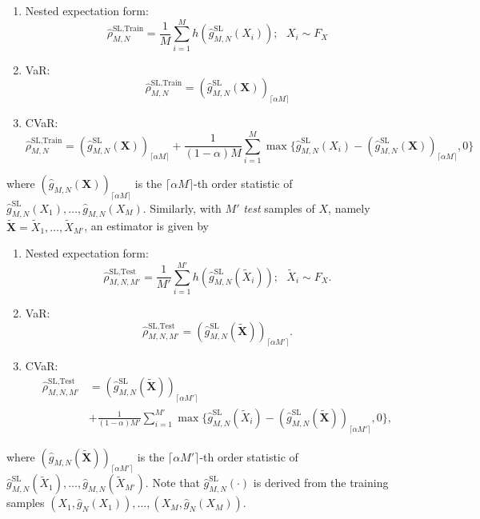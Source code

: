\begin{enumerate}
    \item   Nested expectation form:
            $$\hat{\rho}^{\text{SL}, \text{Train}}_{M, N} = \frac{1}{M} \sum_{i=1}^M h(\hat{g}^{\text{SL}}_{M, N}(X_i)); ~~~ X_i \sim F_X$$
    \item   VaR:
            $$\hat{\rho}^{\text{SL}, \text{Train}}_{M, N} = (\hat{g}^{\text{SL}}_{M, N}(\mathbf{X}))_{\lceil \alpha M \rceil}$$
    \item   CVaR:
            $$\hat{\rho}^{\text{SL}, \text{Train}}_{M, N} = (\hat{g}^{\text{SL}}_{M, N}(\mathbf{X}))_{\lceil \alpha M \rceil} + \frac{1}{(1-\alpha) M} \sum_{i=1}^M \max \{\hat{g}^{\text{SL}}_{M, N}(X_i) - (\hat{g}^{\text{SL}}_{M, N}(\mathbf{X}))_{\lceil \alpha M \rceil}, 0 \}$$
\end{enumerate}
where $(\hat{g}_{M, N}(\mathbf{X}))_{\lceil \alpha M \rceil}$ is the $\lceil \alpha M \rceil$-th order statistic of $\hat{g}^{\text{SL}}_{M, N}(X_1), \dots, \hat{g}_{M, N}(X_M)$.
Similarly, with $M'$ \textit{test} samples of $X$, namely $\tilde{\mathbf{X}} = \tilde{X}_1, \dots, \tilde{X}_{M'}$, an estimator is given by

\begin{enumerate}
    \item   Nested expectation form:
            $$\hat{\rho}^{\text{SL}, \text{Test}}_{M, N, M'} = \frac{1}{M'} \sum_{i=1}^{M'} h(\hat{g}^{\text{SL}}_{M, N}(\tilde{X}_i)); ~~~ \tilde{X}_i \sim F_X.$$
    \item   VaR:
            $$\hat{\rho}^{\text{SL}, \text{Test}}_{M, N, M'} = (\hat{g}^{\text{SL}}_{M, N}(\tilde{\mathbf{X}}))_{\lceil \alpha M' \rceil}.$$
    \item   CVaR:
            \begin{align*}
                \hat{\rho}^{\text{SL}, \text{Test}}_{M, N, M'} & = (\hat{g}^{\text{SL}}_{M, N}(\tilde{\mathbf{X}}))_{\lceil \alpha M' \rceil}  \\
                & + \frac{1}{(1-\alpha) M'} \sum_{i=1}^{M'} \max \{\hat{g}^{\text{SL}}_{M, N}(\tilde{X}_i) - (\hat{g}^{\text{SL}}_{M, N}(\tilde{\mathbf{X}}))_{\lceil \alpha M' \rceil}, 0 \}, 
            \end{align*}
\end{enumerate}
where $(\hat{g}_{M, N}(\tilde{\mathbf{X}}))_{\lceil \alpha M' \rceil}$ is the $\lceil \alpha M' \rceil$-th order statistic of $\hat{g}^{\text{SL}}_{M, N}(\tilde{X}_1), \dots, \hat{g}_{M, N}(\tilde{X}_{M'})$. 
Note that $\hat{g}^{\text{SL}}_{M, N}(\cdot)$ is derived from the training samples $(X_1, \hat{g}_N(X_1)), \dots, (X_M, \hat{g}_N(X_M))$. 

